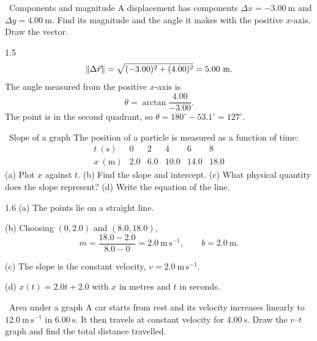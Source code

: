 \begin{exercise}{\core\ Components and magnitude}
A displacement has components $\Delta x=-3.00\ \mathrm{m}$ and
$\Delta y=4.00\ \mathrm{m}$. Find its magnitude and the angle it makes with the
positive $x$-axis. Draw the vector.
\end{exercise}

\begin{tabletworkspace}[6cm]
\end{tabletworkspace}

\begin{solution}{1.5}
\[
\left\lVert \Delta\vec r \right\rVert=\sqrt{(-3.00)^2+(4.00)^2}=5.00\ \mathrm{m}.
\]
The angle measured from the positive $x$-axis is
\[
\theta=\arctan\frac{4.00}{-3.00}.
\]
The point is in the second quadrant, so $\theta=180^\circ-53.1^\circ=127^\circ$.
\end{solution}

\begin{exercise}{\core\ Slope of a graph}
The position of a particle is measured as a function of time:
\[
\begin{array}{c|ccccc}
t\ (\mathrm{s}) & 0 & 2 & 4 & 6 & 8\\
\hline
x\ (\mathrm{m}) & 2.0 & 6.0 & 10.0 & 14.0 & 18.0
\end{array}
\]
(a) Plot $x$ against $t$. (b) Find the slope and intercept. (c) What physical
quantity does the slope represent? (d) Write the equation of the line.
\end{exercise}

\begin{tabletworkspace}[6cm]
\end{tabletworkspace}

\begin{solution}{1.6}
(a) The points lie on a straight line.

(b) Choosing $(0,2.0)$ and $(8.0,18.0)$,
\[
m=\frac{18.0-2.0}{8.0-0}=2.0\ \mathrm{m\,s^{-1}},\qquad b=2.0\ \mathrm{m}.
\]

(c) The slope is the constant velocity, $v=2.0\ \mathrm{m\,s^{-1}}$.

(d) $x(t)=2.0t+2.0$ with $x$ in metres and $t$ in seconds.
\end{solution}

\begin{exercise}{\core\ Area under a graph}
A car starts from rest and its velocity increases linearly to
$12.0\ \mathrm{m\,s^{-1}}$ in $6.00\ \mathrm{s}$. It then travels at constant
velocity for $4.00\ \mathrm{s}$. Draw the $v$--$t$ graph and find the total
distance travelled.
\end{exercise}

